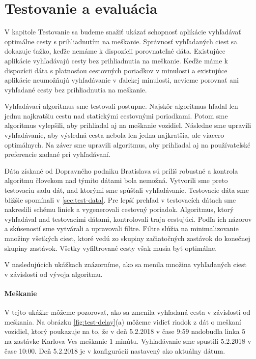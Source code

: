  \chapter{Testovanie a evaluácia}
\label{kap:tes}

V kapitole Testovanie sa budeme snažiť ukázať schopnosť aplikácie vyhľadávať optimálne cesty s prihliadnutím na meškanie. Správnosť vyhľadaných ciest sa dokazuje ťažko, keďže nemáme k dispozícii porovnateľné dáta. Existujúce aplikácie vyhľadávajú cesty bez prihliadnutia na meškanie. Keďže máme k dispozícii dáta s platnosťou cestovných poriadkov v minulosti a existujúce aplikácie neumožňujú vyhľadávanie v ďalekej minulosti, nevieme porovnať ani vyhľadané cesty bez prihliadnutia na meškanie. 

Vyhľadávací algoritmus sme testovali postupne. Najskôr algoritmus hľadal len jednu najkratšiu cestu nad statickými cestovnými poriadkami. Potom sme algoritmus vylepšili, aby prihliadal aj na meškanie vozidiel. Následne sme upravili vyhľadávanie, aby výsledná cesta nebola len jedna najkratšia, ale viacero optimálnych. Na záver sme upravili algoritmus, aby prihliadal aj na používateľské preferencie zadané pri vyhľadávaní.

Dáta získané od Dopravného podniku Bratislava sú príliš robustné a kontrola algoritmu človekom nad týmito dátami bola nemožná. Vytvorili sme preto testovaciu sadu dát, nad ktorými sme spúšťali vyhľadávanie. Testovacie dáta sme bližšie spomínali v \ref{sec:test-data}. Pre lepší prehľad v testovacích dátach sme nakreslili schému liniek a vygenerovali cestovný poriadok. Algoritmus, ktorý vyhľadával nad testovacími dátami, kontrolovali traja cestujúci. Podľa ich názorov a skúseností sme vytvárali a upravovali filtre. Filtre slúžia na minimalizovanie množiny všetkých ciest, ktoré vedú zo skupiny začiatočných zastávok do konečnej skupiny zastávok. Všetky vyfiltrované cesty však musia byť optimálne.

V nasledujúcich ukážkach znázorníme, ako sa menila množina vyhľadaných ciest v závislosti od vývoja algoritmu.

\subsubsection{Meškanie}
V tejto ukážke môžeme pozorovať, ako sa zmenila vyhľadaná cesta v závislosti od meškania. Na obrázku \ref{fig:test-delay}(a) môžeme vidieť riadok z dát o meškaní vozidiel, ktorý poukazuje na to, že v deň 5.2.2018 v čase 9:59 nadobudla linka $5$ na zastávke Karlova Ves meškanie $1$ minútu. Vyhľadávanie sme spustili 5.2.2018 v čase 10:00. Deň 5.2.2018 je v konfigurácii nastavený ako aktuálny dátum. 


